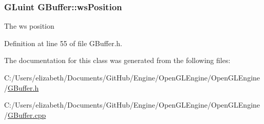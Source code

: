 \subsubsection[{\texorpdfstring{ws\+Position}{wsPosition}}]{\setlength{\rightskip}{0pt plus 5cm}G\+Luint G\+Buffer\+::ws\+Position\hspace{0.3cm}{\ttfamily [private]}}\hypertarget{class_g_buffer_a05c0bc927dc2295add2ef8e50e160862}{}\label{class_g_buffer_a05c0bc927dc2295add2ef8e50e160862}


The ws position 



Definition at line 55 of file G\+Buffer.\+h.



The documentation for this class was generated from the following files\+:\begin{DoxyCompactItemize}
\item 
C\+:/\+Users/elizabeth/\+Documents/\+Git\+Hub/\+Engine/\+Open\+G\+L\+Engine/\+Open\+G\+L\+Engine/\hyperlink{_g_buffer_8h}{G\+Buffer.\+h}\item 
C\+:/\+Users/elizabeth/\+Documents/\+Git\+Hub/\+Engine/\+Open\+G\+L\+Engine/\+Open\+G\+L\+Engine/\hyperlink{_g_buffer_8cpp}{G\+Buffer.\+cpp}\end{DoxyCompactItemize}
